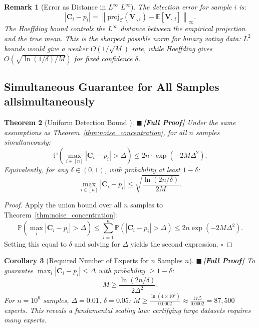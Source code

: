 \documentclass[12pt,a4paper]{article}
\newtheorem{theorem}{Theorem}[section]
\newtheorem{corollary}[theorem]{Corollary}
\newtheorem{remark}[theorem]{Remark}
\theoremstyle{definition}
\newcommand{\rigorFull}{{\color{rigorcolor}$\blacksquare$\,\textbf{[Full Proof]}}}
\newcommand{\E}{\mathbb{E}}
\newcommand{\Pbb}{\mathbb{P}}
\newcommand{\cC}{\mathcal{C}}
\newcommand{\norm}[1]{\left\lVert#1\right\rVert}
\newcommand{\abs}[1]{\left|#1\right|}
\newcommand{\mat}[1]{\mathbf{#1}}
\begin{document}
\begin{remark}[Error as Distance in $L^\infty$ $L^\infty$]
The detection error for sample $i$ is:
\[
\abs{\mat{C}_i - p_i} = \norm{\text{proj}_{\cC}(\mat{V}_{\cdot,i}) - \E[\mat{V}_{\cdot,i}]}_\infty.
\]
The Hoeffding bound controls the $L^\infty$ distance between the empirical projection 
and the true mean. This is the sharpest possible norm for binary voting data: $L^2$ 
bounds would give a weaker $O(1/\sqrt{M})$ rate, while Hoeffding gives 
$O(\sqrt{\ln(1/\delta)/M})$ for fixed confidence $\delta$.
\end{remark}

\subsection{Simultaneous Guarantee for All Samples allsimultaneously}

\begin{theorem}[Uniform Detection Bound ]\label{thm:uniform_detection}
\rigorFull
Under the same assumptions as Theorem~\ref{thm:noise_concentration}, for all $n$ 
samples simultaneously:
\begin{equation}\label{eq:uniform_bound}
    \Pbb\left(\max_{i \in [n]} \abs{\mat{C}_i - p_i} > \Delta\right) \leq 2n \cdot \exp\!\left(-2M\Delta^2\right).
\end{equation}
Equivalently, for any $\delta \in (0,1)$, with probability at least $1-\delta$:
\[
\max_{i \in [n]} \abs{\mat{C}_i - p_i} \leq \sqrt{\frac{\ln(2n/\delta)}{2M}}.
\]
\end{theorem}

\begin{proof}
Apply the union bound over all $n$ samples to Theorem~\ref{thm:noise_concentration}:
\[
\Pbb\left(\max_i \abs{\mat{C}_i - p_i} > \Delta\right) \leq \sum_{i=1}^{n} \Pbb(\abs{\mat{C}_i - p_i} > \Delta) \leq 2n \exp(-2M\Delta^2).
\]
Setting this equal to $\delta$ and solving for $\Delta$ yields the second expression. \hfill $\square$
\end{proof}

\begin{corollary}[Required Number of Experts for $n$ Samples $n$]\label{cor:required_experts}
\rigorFull
To guarantee $\max_i |\mat{C}_i - p_i| \leq \Delta$ with probability $\geq 1-\delta$:
\begin{equation}\label{eq:M_required_noise}
    M \geq \frac{\ln(2n/\delta)}{2\Delta^2}.
\end{equation}
For $n = 10^6$ samples, $\Delta = 0.01$, $\delta = 0.05$: 
$M \geq \frac{\ln(4 \times 10^7)}{0.0002} \approx \frac{17.5}{0.0002} = 87,500$ experts.
This reveals a fundamental scaling law: certifying large datasets requires many experts.
\end{corollary}
\end{document}
